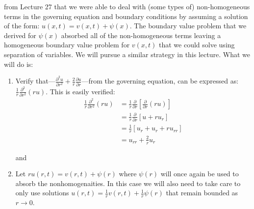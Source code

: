  from Lecture 27 that we were able to deal with (some types of) non-homogeneous terms in the governing equation and boundary conditions by assuming a solution of the form: $u(x,t) = v(x,t) + \psi(x)$.  The boundary value problem that we derived for $\psi(x)$ absorbed all of the non-homogeneous terms leaving a homogeneous boundary value problem for $v(x,t)$ that we could solve using separation of variables.  We will pursue a similar strategy in this lecture. What we will do is:

\begin{enumerate}
\item Verify that---$\frac{\partial^2 u}{\partial r^2} + \frac{2}{r}\frac{\partial u}{\partial r}$---from the governing equation, can be expressed as: $\frac{1}{r}\frac{\partial^2}{\partial r^2}(ru)$.  This is easily verified:
\begin{align*}
\frac{1}{r}\frac{\partial^2}{\partial r^2}(ru) &= \frac{1}{r}\frac{\partial}{\partial r}\left[\frac{\partial}{\partial r}(ru)\right] \\
&= \frac{1}{r}\frac{\partial}{\partial r}\left[u + ru_r\right] \\
&= \frac{1}{r}\left[u_r + u_r + ru_{rr}\right] \\
&= u_{rr} + \frac{2}{r}u_r
\end{align*}

and

\item Let $ru(r,t) = v(r,t) + \psi(r)$ where $\psi(r)$ will once again be used to absorb the nonhomogenaities.  In this case we will also need to take care to only use solutions $u(r,t) = \frac{1}{r}v(r,t)+\frac{1}{r}\psi(r)$ that remain bounded as $r \to 0$.
\end{enumerate}

